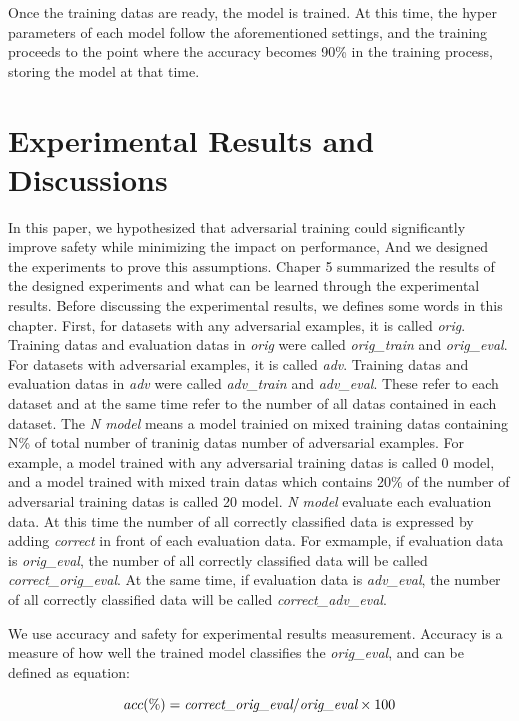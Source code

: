 \documentclass[journal,article,submit,moreauthors,pdftex]{Definitions/mdpi}
\begin{document}
Once the training datas are ready, the model is trained. At this time, the hyper parameters of each model follow the aforementioned settings, and the training proceeds to the point where the accuracy becomes 90\% in the training process, storing the model at that time.

\section{Experimental Results and Discussions}

In this paper, we hypothesized that adversarial training could significantly improve safety while minimizing the impact on performance, And we designed the experiments to prove this assumptions.
Chaper 5 summarized the results of the designed experiments and what can be learned through the experimental results.
Before discussing the experimental results, we defines some words in this chapter.
First, for datasets with any adversarial examples, it is called {\it orig}. Training datas and evaluation datas in {\it orig} were called {\it orig\_train} and {\it orig\_eval}.
For datasets with adversarial examples, it is called {\it adv}. Training datas and evaluation datas in {\it adv} were called {\it adv\_train} and {\it adv\_eval}.
These refer to each dataset and at the same time refer to the number of all datas contained in each dataset.
The {\it N model} means a model trainied on mixed training datas containing N\% of total number of traninig datas number of adversarial examples.
For example, a model trained with any adversarial training datas is called 0 model, and a model trained with mixed train datas which contains 20\% of the number of adversarial training datas is called 20 model.
{\it N model} evaluate each evaluation data. At this time the number of all correctly classified data is expressed by adding {\it correct} in front of each evaluation data.
For exmample, if evaluation data is {\it orig\_eval}, the number of all correctly classified data will be called {\it correct\_orig\_eval}.
At the same time, if evaluation data is {\it adv\_eval}, the number of all correctly classified data will be called {\it correct\_adv\_eval}.

We use accuracy and safety for experimental results measurement. Accuracy is a measure of how well the trained model classifies the {\it orig\_eval}, and can be defined as equation:

\begin{equation}
    acc(\%) = \text{{\it correct\_orig\_eval}} / \text{{\it orig\_eval}} \times 100
\end{equation} 
\end{document}
